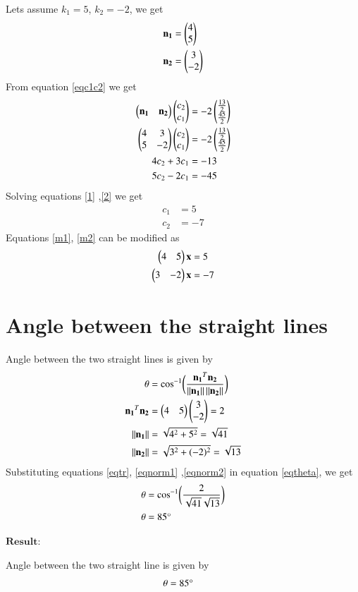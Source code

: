 \documentclass[journal,12pt,twocolumn]{IEEEtran}
\begin{document}
Lets assume $k_1=5$, $k_2=-2$, we get 
\begin{align}
    \mathbf{n_1}&=\begin{pmatrix}4 \\5\end{pmatrix}\label{n11}\\
    \mathbf{n_2}&=\begin{pmatrix}3\\-2\end{pmatrix}\label{n22}
\end{align}
From equation \eqref{eqc1c2} we get 
\begin{align}
    \begin{pmatrix}\mathbf{n_1} & \mathbf{n_2}\end{pmatrix}\begin{pmatrix}c_2\\c_1\end{pmatrix}&=-2\begin{pmatrix}\frac{13}{2}\\\frac{45}{2}\end{pmatrix}\\
    \begin{pmatrix}4 & 3\\5 & -2\end{pmatrix}\begin{pmatrix}c_2\\c_1\end{pmatrix}&=-2\begin{pmatrix}\frac{13}{2}\\\frac{45}{2}\end{pmatrix}\\
    4c_2+3c_1&=-13\label{1}\\
    5c_2-2c_1&=-45\label{2}
\end{align}
Solving equations \eqref{1} ,\eqref{2} we get 
\begin{align}
    c_1&=5\\
    c_2&=-7
\end{align}
Equations \eqref{m1}, \eqref{m2} can be modified as
\begin{align}
    \begin{pmatrix}4 & 5\end{pmatrix}\mathbf{x}&=5\\
    \begin{pmatrix}3 & -2\end{pmatrix}\mathbf{x}&=-7
\end{align}

\section{Angle between the straight lines}
Angle between the two straight lines is given by 
\begin{align}
    \theta&=\cos^{-1}\biggl(\frac{\mathbf{n_1}^T\mathbf{n_2}}{\left\lVert\mathbf{n_1}\right\rVert\left\lVert\mathbf{n_2}\right\rVert}\biggr)\label{eqt}\label{eqtheta}\\
    \mathbf{n_1}^T\mathbf{n_2}&=\begin{pmatrix}4 & 5\end{pmatrix}\begin{pmatrix}3\\-2\end{pmatrix}=2\label{eqtr}\\
    \left\lVert\mathbf{n_1}\right\rVert&=\sqrt{4^2+5^2}=\sqrt{41}\label{eqnorm1}\\
    \left\lVert\mathbf{n_2}\right\rVert&=\sqrt{3^2+(-2)^2}=\sqrt{13}\label{eqnorm2}
\end{align}
Substituting equations \eqref{eqtr}, \eqref{eqnorm1} ,\eqref{eqnorm2} in equation \eqref{eqtheta}, we get 
\begin{align}
        \theta&=\cos^{-1}\biggl(\frac{2}{\sqrt{41}\sqrt{13}}\biggr)\\
        \theta&=85\degree
\end{align}

$\boldsymbol{ Result : }$

Angle between the two straight line is given by
\begin{align}
    \theta&=85\degree
\end{align}
\end{document}
